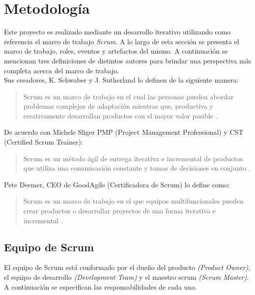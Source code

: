 \section{Metodología}

 Este proyecto es realizado mediante un desarrollo iterativo utilizando como referencia
 el marco de trabajo {\it Scrum}. A lo largo de esta sección se presenta el marco de trabajo,
 roles, eventos y artefactos del mismo. A continuación se mencionan tres definiciones
 de distintos autores para brindar una perspectiva más completa acerca del marco de trabajo.\\

    \noindent Sus creadores, K. Schwaber y J. Sutherland lo definen de la siguiente manera:
        \begin{quote}
        Scrum es un marco de trabajo en el cual las personas pueden abordar
        problemas complejos de adaptación mientras que, productiva y creativamente
        desarrollan productos con el mayor valor posible \cite{TheScrumGuide}.
        \end{quote}

    \noindent De acuerdo con Michele Sliger PMP (Project Management Professional) y CST (Certified
     Scrum Trainer):
        \begin{quote}
        Scrum es un método ágil de entrega iterativa e incremental de productos que
        utiliza una comunicación constante y tomas de decisiones en conjunto \cite{Sliger1}.
        \end{quote}

    \noindent Pete Deemer, CEO de GoodAgile (Certificadora de Scrum) lo define como:
        \begin{quote}
        Scrum es un marco de trabajo en el que equipos multifuncionales pueden crear productos
        o desarrollar proyectos de una forma iterativa e incremental \cite{ScrumPrimer}.
        \end{quote}


\clearpage

\subsection{Equipo de Scrum}

 El equipo de Scrum está conformado por el dueño del producto {\em(Product Owner)},
 el equipo de desarrollo {\em(Development Team)} y el maestro scrum
 {\em(Scrum Master)}. A continuación se especifican las responsabilidades de cada uno.

